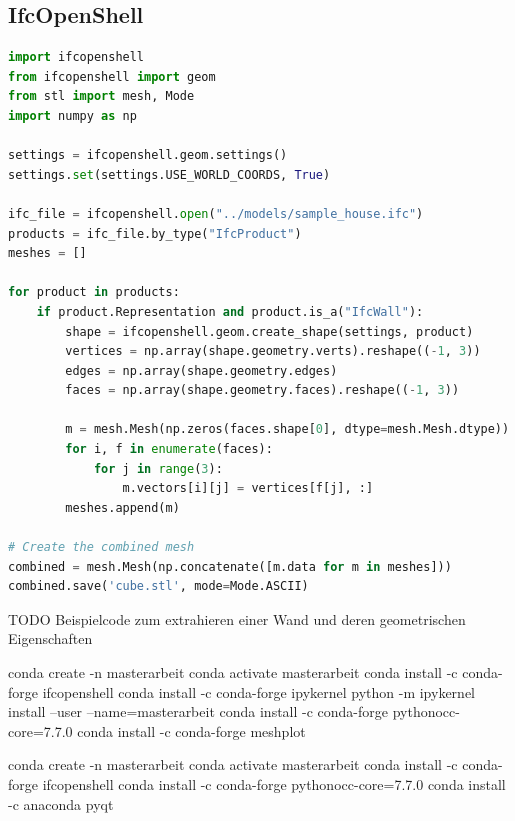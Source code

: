 \subsection{IfcOpenShell} \label{basics:ifcopenshell}
\begin{lstlisting}[language=Python, caption=Beispielprogrammcode um bestimmte Daten aus einem IFC File zu laden und daraus ein Mesh zu generieren]
import ifcopenshell
from ifcopenshell import geom
from stl import mesh, Mode
import numpy as np

settings = ifcopenshell.geom.settings()
settings.set(settings.USE_WORLD_COORDS, True)

ifc_file = ifcopenshell.open("../models/sample_house.ifc")
products = ifc_file.by_type("IfcProduct")
meshes = []

for product in products:
    if product.Representation and product.is_a("IfcWall"):
        shape = ifcopenshell.geom.create_shape(settings, product)
        vertices = np.array(shape.geometry.verts).reshape((-1, 3))
        edges = np.array(shape.geometry.edges)
        faces = np.array(shape.geometry.faces).reshape((-1, 3))

        m = mesh.Mesh(np.zeros(faces.shape[0], dtype=mesh.Mesh.dtype))
        for i, f in enumerate(faces):
            for j in range(3):
                m.vectors[i][j] = vertices[f[j], :]
        meshes.append(m)

# Create the combined mesh
combined = mesh.Mesh(np.concatenate([m.data for m in meshes]))
combined.save('cube.stl', mode=Mode.ASCII)
\end{lstlisting}
TODO Beispielcode zum extrahieren einer Wand und deren geometrischen Eigenschaften

conda create -n masterarbeit
conda activate masterarbeit
conda install -c conda-forge ifcopenshell
conda install -c conda-forge ipykernel
python -m ipykernel install --user --name=masterarbeit
conda install -c conda-forge pythonocc-core=7.7.0
conda install -c conda-forge meshplot 

conda create -n masterarbeit
conda activate masterarbeit
conda install -c conda-forge ifcopenshell
conda install -c conda-forge pythonocc-core=7.7.0
conda install -c anaconda pyqt 

